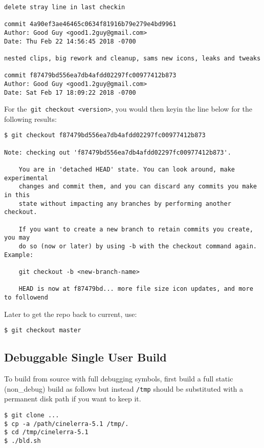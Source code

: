 \begin{lstlisting}[numbers=none]
delete stray line in last checkin

commit 4a90ef3ae46465c0634f81916b79e279e4bd9961
Author: Good Guy <good1.2guy@gmail.com>
Date: Thu Feb 22 14:56:45 2018 -0700

nested clips, big rework and cleanup, sams new icons, leaks and tweaks

commit f87479bd556ea7db4afdd02297fc00977412b873
Author: Good Guy <good1.2guy@gmail.com>
Date: Sat Feb 17 18:09:22 2018 -0700
\end{lstlisting}

For the\texttt{ git checkout <version>}, you would then keyin the line below for the following results:

\begin{lstlisting}[numbers=none]
$ git checkout f87479bd556ea7db4afdd02297fc00977412b873

Note: checking out 'f87479bd556ea7db4afdd02297fc00977412b873'.

	You are in 'detached HEAD' state. You can look around, make experimental
	changes and commit them, and you can discard any commits you make in this
	state without impacting any branches by performing another checkout.

	If you want to create a new branch to retain commits you create, you may
	do so (now or later) by using -b with the checkout command again. Example:

  	git checkout -b <new-branch-name>

	HEAD is now at f87479bd... more file size icon updates, and more to followend
\end{lstlisting}

Later to get the repo back to current, use:    
\begin{lstlisting}[numbers=none]
$ git checkout master
\end{lstlisting}


\subsection{Debuggable Single User Build}%
\label{sub:debuggable_single_user_build}


To build from source with full debugging symbols, first build a full static (non\_debug) build as follows but instead \texttt{/tmp} should be substituted with a permanent disk path if you want to keep it.

\begin{lstlisting}[numbers=none]
$ git clone ...
$ cp -a /path/cinelerra-5.1 /tmp/.
$ cd /tmp/cinelerra-5.1
$ ./bld.sh
\end{lstlisting}



